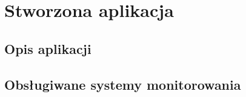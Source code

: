 \chapter[Stworzona aplikacja.]{Stworzona aplikacja}

\section{Opis aplikacji}

\section{Obsługiwane systemy monitorowania}